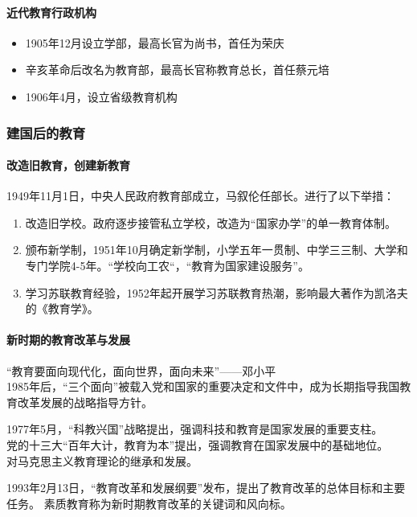 \documentclass[b5paper,11pt]{article}
\begin{document}
\paragraph{近代教育行政机构}
\begin{itemize}
  \item 1905年12月设立学部，最高长官为尚书，首任为荣庆
  \item 辛亥革命后改名为教育部，最高长官称教育总长，首任蔡元培
  \item 1906年4月，设立省级教育机构
\end{itemize}

\subsubsection{建国后的教育}
\paragraph{改造旧教育，创建新教育} 1949年11月1日，中央人民政府教育部成立，马叙伦任部长。进行了以下举措：
\begin{enumerate}
  \item 改造旧学校。政府逐步接管私立学校，改造为“国家办学”的单一教育体制。
  \item 颁布新学制，1951年10月确定新学制，小学五年一贯制、中学三三制、大学和专门学院4-5年。“学校向工农“，“教育为国家建设服务”。
  \item 学习苏联教育经验，1952年起开展学习苏联教育热潮，影响最大著作为凯洛夫的《教育学》。
\end{enumerate}

\paragraph{新时期的教育改革与发展}
“教育要面向现代化，面向世界，面向未来”——邓小平 \\
1985年后，\textcolor{ctp-red}{“三个面向”}被载入党和国家的重要决定和文件中，成为长期指导我国教育改革发展的战略指导方针。

\noindent
1977年5月，\textcolor{ctp-red}{“科教兴国”}战略提出，强调科技和教育是国家发展的重要支柱。 \\
党的十三大“百年大计，教育为本”提出，强调教育在国家发展中的基础地位。 \\
对马克思主义教育理论的继承和发展。

1993年2月13日，\textcolor{ctp-red}{“教育改革和发展纲要”}发布，提出了教育改革的总体目标和主要任务。
\textcolor{ctp-red}{素质教育称为新时期教育改革的关键词和风向标}。
\end{document}
